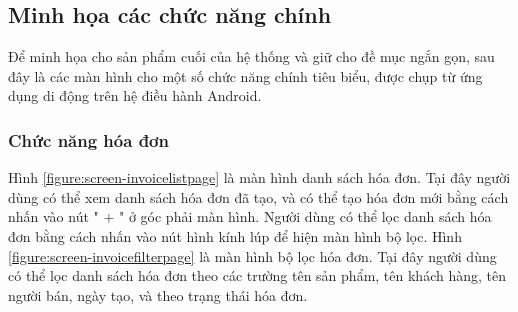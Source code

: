 \documentclass[../DoAn.tex]{subfiles}
\begin{document}
\subsection{Minh họa các chức năng chính}
Để minh họa cho sản phẩm cuối của hệ thống và giữ cho đề mục ngắn gọn, sau đây là các màn hình cho một số chức năng chính tiêu biểu, được chụp từ ứng dụng di động trên hệ điều hành Android.

\subsubsection{Chức năng hóa đơn}
Hình \ref{figure:screen-invoicelistpage} là màn hình danh sách hóa đơn. Tại đây người dùng có thể xem danh sách hóa đơn đã tạo, và có thể tạo hóa đơn mới bằng cách nhấn vào nút " + " ở góc phải màn hình. Người dùng có thể lọc danh sách hóa đơn bằng cách nhấn vào nút hình kính lúp để hiện màn hình bộ lọc. Hình \ref{figure:screen-invoicefilterpage} là màn hình bộ lọc hóa đơn. Tại đây người dùng có thể lọc danh sách hóa đơn theo các trường tên sản phẩm, tên khách hàng, tên người bán, ngày tạo, và theo trạng thái hóa đơn.
\end{document}
